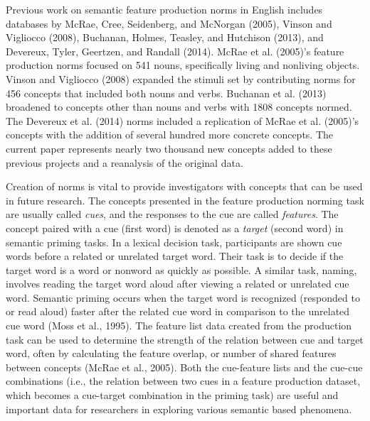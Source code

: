 \documentclass[english,,man]{apa6}
\begin{document}
Previous work on semantic feature production norms in English includes databases by McRae, Cree, Seidenberg, and McNorgan (2005), Vinson and Vigliocco (2008), Buchanan, Holmes, Teasley, and Hutchison (2013), and Devereux, Tyler, Geertzen, and Randall (2014). McRae et al. (2005)'s feature production norms focused on 541 nouns, specifically living and nonliving objects. Vinson and Vigliocco (2008) expanded the stimuli set by contributing norms for 456 concepts that included both nouns and verbs. Buchanan et al. (2013) broadened to concepts other than nouns and verbs with 1808 concepts normed. The Devereux et al. (2014) norms included a replication of McRae et al. (2005)'s concepts with the addition of several hundred more concrete concepts. The current paper represents nearly two thousand new concepts added to these previous projects and a reanalysis of the original data.

Creation of norms is vital to provide investigators with concepts that can be used in future research. The concepts presented in the feature production norming task are usually called \emph{cues}, and the responses to the cue are called \emph{features}. The concept paired with a cue (first word) is denoted as a \emph{target} (second word) in semantic priming tasks. In a lexical decision task, participants are shown cue words before a related or unrelated target word. Their task is to decide if the target word is a word or nonword as quickly as possible. A similar task, naming, involves reading the target word aloud after viewing a related or unrelated cue word. Semantic priming occurs when the target word is recognized (responded to or read aloud) faster after the related cue word in comparison to the unrelated cue word (Moss et al., 1995). The feature list data created from the production task can be used to determine the strength of the relation between cue and target word, often by calculating the feature overlap, or number of shared features between concepts (McRae et al., 2005). Both the cue-feature lists and the cue-cue combinations (i.e., the relation between two cues in a feature production dataset, which becomes a cue-target combination in the priming task) are useful and important data for researchers in exploring various semantic based phenomena.
\end{document}
